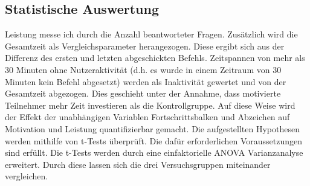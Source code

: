 \subsection{Statistische Auswertung}
Leistung messe ich durch die Anzahl beantworteter Fragen. Zusätzlich wird die Gesamtzeit als Vergleichsparameter herangezogen. Diese ergibt sich aus der Differenz des ersten und letzten abgeschickten Befehls. Zeitspannen von mehr als 30 Minuten ohne Nutzeraktivität (d.h. es wurde in einem Zeitraum von 30 Minuten kein Befehl abgesetzt) werden als Inaktivität gewertet und von der Gesamtzeit abgezogen. Dies geschieht unter der Annahme, dass motivierte Teilnehmer mehr Zeit investieren als die Kontrollgruppe. Auf diese Weise wird der Effekt der unabhängigen Variablen Fortschrittsbalken und Abzeichen auf Motivation und Leistung quantifizierbar gemacht. Die aufgestellten Hypothesen werden mithilfe von t-Tests überprüft. Die dafür erforderlichen Voraussetzungen sind erfüllt. Die t-Tests werden durch eine einfaktorielle ANOVA Varianzanalyse erweitert. Durch diese lassen sich die drei Versuchsgruppen miteinander vergleichen.